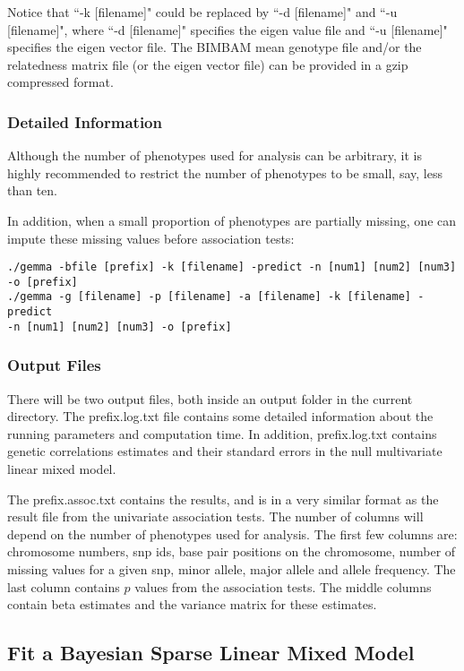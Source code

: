 \documentclass[11pt]{article}
\begin{document}
Notice that ``-k [filename]" could be replaced by ``-d [filename]" and
``-u [filename]", where ``-d [filename]" specifies the eigen value
file and ``-u [filename]" specifies the eigen vector file. The BIMBAM
mean genotype file and/or the relatedness matrix file (or the eigen
vector file) can be provided in a gzip compressed format.

\subsubsection{Detailed Information}

Although the number of phenotypes used for analysis can be arbitrary,
it is highly recommended to restrict the number of phenotypes to be
small, say, less than ten.

In addition, when a small proportion of phenotypes are partially
missing, one can impute these missing values before association tests:

\begin{verbatim}
./gemma -bfile [prefix] -k [filename] -predict -n [num1] [num2] [num3] -o [prefix]
./gemma -g [filename] -p [filename] -a [filename] -k [filename] -predict
-n [num1] [num2] [num3] -o [prefix]
\end{verbatim}

\subsubsection{Output Files}

There will be two output files, both inside an output folder in the
current directory. The prefix.log.txt file contains some detailed
information about the running parameters and computation time. In
addition, prefix.log.txt contains genetic correlations estimates and
their standard errors in the null multivariate linear mixed model.

The prefix.assoc.txt contains the results, and is in a very similar
format as the result file from the univariate association tests. The
number of columns will depend on the number of phenotypes used for
analysis. The first few columns are: chromosome numbers, snp ids, base
pair positions on the chromosome, number of missing values for a given
snp, minor allele, major allele and allele frequency. The last column
contains $p$ values from the association tests. The middle columns
contain beta estimates and the variance matrix for these estimates.

\subsection{Fit a Bayesian Sparse Linear Mixed Model}
\end{document}
